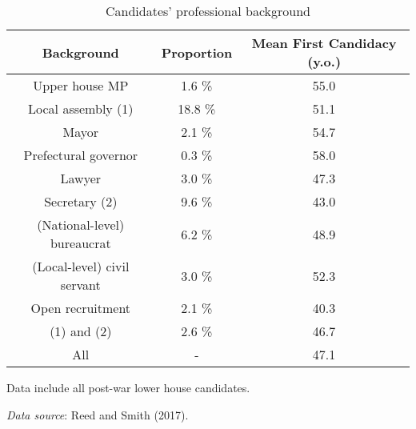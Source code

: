 \begin{table}
\begin{threeparttable}
\begin{tabular}{c|cc}
\toprule
Background & Proportion & Mean First Candidacy (y.o.) \\
\midrule
Upper house MP & 1.6 \% & 55.0 \\
Local assembly (1) & 18.8 \% & 51.1 \\
Mayor & 2.1 \% & 54.7 \\
Prefectural governor & 0.3 \% & 58.0 \\
Lawyer & 3.0 \% & 47.3 \\
Secretary (2) & 9.6 \% & 43.0 \\ 
(National-level) bureaucrat & 6.2 \% & 48.9 \\
(Local-level) civil servant & 3.0 \% & 52.3 \\
Open recruitment & 2.1 \% & 40.3 \\
(1) and (2) & 2.6 \% & 46.7 \\
All & - & 47.1 \\
\bottomrule
\end{tabular}
\begin{tablenotes}[flushleft]
  \scriptsize{
    \item Data include all post-war lower house candidates. 
    \item \textit{Data source}: Reed and Smith (2017). 
  }
\end{tablenotes}
\end{threeparttable}
\caption{Candidates' professional background}
\label{table:propProfessionCandidates}
\end{table}
